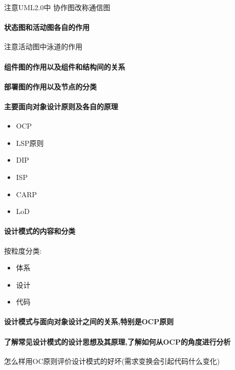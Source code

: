 \documentclass[UTF8,a4paper]{ctexart}
\begin{document}
注意UML2.0中 协作图改称通信图

\paragraph{状态图和活动图各自的作用}注意活动图中泳道的作用

\paragraph{组件图的作用以及组件和结构间的关系}

\paragraph{部署图的作用以及节点的分类}

\paragraph{主要面向对象设计原则及各自的原理}
\begin{itemize}
  \item OCP
  \item LSP原则
  \item DIP
  \item ISP
  \item CARP
  \item LoD
\end{itemize}

\paragraph{设计模式的内容和分类}
按粒度分类:
\begin{itemize}
  \item 体系
  \item 设计
  \item 代码
\end{itemize}

\paragraph{设计模式与面向对象设计之间的关系,特别是OCP原则}

\paragraph{了解常见设计模式的设计思想及其原理,了解如何从OCP的角度进行分析}
怎么样用OC原则评价设计模式的好坏(需求变换会引起代码什么变化)
\end{document}
